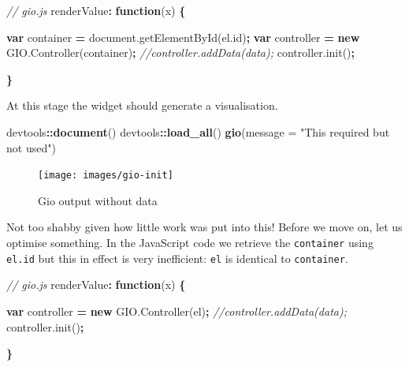 \documentclass[
  10pt,
]{krantz}
\makeatletter
\newenvironment{Shaded}{\begin{snugshade}}{\end{snugshade}}
\newcommand{\AttributeTok}[1]{\textcolor[rgb]{0.61,0.61,0.61}{#1}}
\newcommand{\CommentTok}[1]{\textcolor[rgb]{0.37,0.37,0.37}{\textit{#1}}}
\newcommand{\DataTypeTok}[1]{\textcolor[rgb]{0.27,0.27,0.27}{#1}}
\newcommand{\KeywordTok}[1]{\textcolor[rgb]{0.27,0.27,0.27}{\textbf{#1}}}
\newcommand{\NormalTok}[1]{#1}
\newcommand{\OperatorTok}[1]{\textcolor[rgb]{0.43,0.43,0.43}{\textbf{#1}}}
\newcommand{\StringTok}[1]{\textcolor[rgb]{0.5,0.5,0.5}{#1}}
\newcommand{\VariableTok}[1]{\textcolor[rgb]{0,0,0}{#1}}
\newenvironment{kframe}{%
\medskip{}
\setlength{\fboxsep}{.8em}
 \def\at@end@of@kframe{}%
 \ifinner\ifhmode%
  \def\at@end@of@kframe{\end{minipage}}%
  \begin{minipage}{\columnwidth}%
 \fi\fi%
 \def\FrameCommand##1{\hskip\@totalleftmargin \hskip-\fboxsep
 \colorbox{shadecolor}{##1}\hskip-\fboxsep
     \hskip-\linewidth \hskip-\@totalleftmargin \hskip\columnwidth}%
 \MakeFramed {\advance\hsize-\width
   \@totalleftmargin\z@ \linewidth\hsize
   \@setminipage}}%
 {\par\unskip\endMakeFramed%
 \at@end@of@kframe}
\renewenvironment{Shaded}{\begin{kframe}}{\end{kframe}}
\makeatother
\begin{document}
\begin{Shaded}
\begin{Highlighting}[]
\CommentTok{// gio.js}
\NormalTok{renderValue}\OperatorTok{:} \KeywordTok{function}\NormalTok{(x) }\OperatorTok{\{}

  \KeywordTok{var}\NormalTok{ container }\OperatorTok{=} \VariableTok{document}\NormalTok{.}\AttributeTok{getElementById}\NormalTok{(}\VariableTok{el}\NormalTok{.}\AttributeTok{id}\NormalTok{)}\OperatorTok{;}
  \KeywordTok{var}\NormalTok{ controller }\OperatorTok{=} \KeywordTok{new} \VariableTok{GIO}\NormalTok{.}\AttributeTok{Controller}\NormalTok{(container)}\OperatorTok{;}
  \CommentTok{//controller.addData(data);}
  \VariableTok{controller}\NormalTok{.}\AttributeTok{init}\NormalTok{()}\OperatorTok{;}

\OperatorTok{\}}
\end{Highlighting}
\end{Shaded}

At this stage the widget should generate a visualisation.

\begin{Shaded}
\begin{Highlighting}[]
\NormalTok{devtools}\OperatorTok{::}\KeywordTok{document}\NormalTok{()}
\NormalTok{devtools}\OperatorTok{::}\KeywordTok{load\_all}\NormalTok{()}
\KeywordTok{gio}\NormalTok{(}\DataTypeTok{message =} \StringTok{"This required but not used"}\NormalTok{)}
\end{Highlighting}
\end{Shaded}

\begin{figure}[H]

{\centering \texttt{[image: images/gio-init]} 

}

\caption{Gio output without data}\label{fig:gio-init}
\end{figure}

Not too shabby given how little work was put into this! Before we move on, let us optimise something. In the JavaScript code we retrieve the \texttt{container} using \texttt{el.id} but this in effect is very inefficient: \texttt{el} is identical to \texttt{container}.

\begin{Shaded}
\begin{Highlighting}[]
\CommentTok{// gio.js}
\NormalTok{renderValue}\OperatorTok{:} \KeywordTok{function}\NormalTok{(x) }\OperatorTok{\{}

  \KeywordTok{var}\NormalTok{ controller }\OperatorTok{=} \KeywordTok{new} \VariableTok{GIO}\NormalTok{.}\AttributeTok{Controller}\NormalTok{(el)}\OperatorTok{;}
  \CommentTok{//controller.addData(data);}
  \VariableTok{controller}\NormalTok{.}\AttributeTok{init}\NormalTok{()}\OperatorTok{;}

\OperatorTok{\}}
\end{Highlighting}
\end{Shaded}
\end{document}
